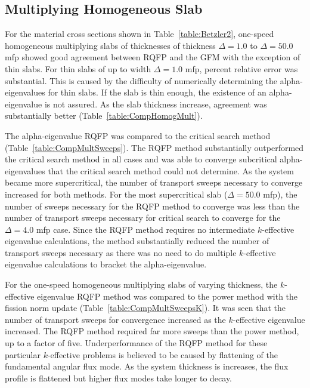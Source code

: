 \subsection{Multiplying Homogeneous Slab}

For the material cross sections shown in Table~\ref{table:Betzler2}, one-speed homogeneous multiplying slabs of thicknesses of thickness $\Delta = 1.0$ to $\Delta = 50.0$ mfp showed good agreement between RQFP and the GFM with the exception of thin slabs. For thin slabs of up to width $\Delta = 1.0$ mfp, percent relative error was substantial. This is caused by the difficulty of numerically determining the alpha-eigenvalues for thin slabs. If the slab is thin enough, the existence of an alpha-eigenvalue is not assured. As the slab thickness increase, agreement was substantially better (Table~\ref{table:CompHomogMult}). 

The alpha-eigenvalue RQFP was compared to the critical search method (Table~\ref{table:CompMultSweeps}). The RQFP method substantially outperformed the critical search method in all cases and was able to converge subcritical alpha-eigenvalues that the critical search method could not determine. As the system became more supercritical, the number of transport sweeps necessary to converge increased for both methods. For the most supercritical slab ($\Delta = 50.0$ mfp), the number of sweeps necessary for the RQFP method to converge was less than the number of transport sweeps necessary for critical search to converge for the $\Delta = 4.0$ mfp case. Since the RQFP method requires no intermediate $k$-effective eigenvalue calculations, the method substantially reduced the number of transport sweeps necessary as there was no need to do multiple $k$-effective eigenvalue calculations to bracket the alpha-eigenvalue.

For the one-speed homogeneous multiplying slabs of varying thickness, the $k$-effective eigenvalue RQFP method was compared to the power method with the fission norm update (Table~\ref{table:CompMultSweepsK}). It was seen that the number of transport sweeps for convergence increased as the $k$-effective eigenvalue increased. The RQFP method required far more sweeps than the power method, up to a factor of five. Underperformance of the RQFP method for these particular $k$-effective problems is believed to be caused by flattening of the fundamental angular flux mode. As the system thickness is increases, the flux profile is flattened but higher flux modes take longer to decay.

